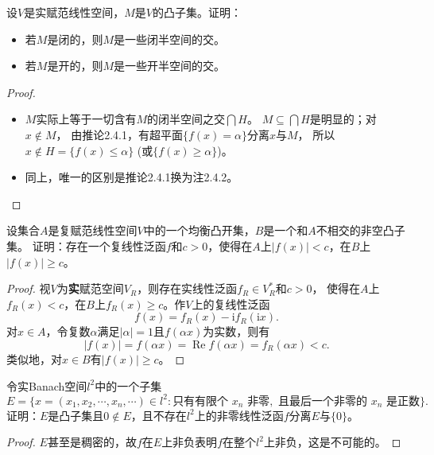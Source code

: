 \begin{8}
    设$V$是实赋范线性空间，$M$是$V$的凸子集。证明：
    \begin{itemize}
        \item[(i)] 若$M$是闭的，则$M$是一些闭半空间的交。
        \item[(ii)] 若$M$是开的，则$M$是一些开半空间的交。
    \end{itemize}
\end{8}
\begin{proof}
    \begin{itemize}
        \item[(i)] $M$实际上等于一切含有$M$的闭半空间之交$\bigcap H$。
        $M\subseteq\bigcap H$是明显的；对$x \notin M$，
        由推论2.4.1，有超平面$\{f(x)=\alpha\}$分离$x$与$M$，
        所以$x \notin H=\{f(x)\leqslant\alpha\}$ (或$\{f(x)\geqslant\alpha\}$)。
        \item[(ii)] 同上，唯一的区别是推论2.4.1换为注2.4.2。\qedhere
    \end{itemize}
\end{proof}

\begin{9}
    设集合$A$是复赋范线性空间$V$中的一个均衡凸开集，$B$是一个和$A$不相交的非空凸子集。
    证明：存在一个复线性泛函$f$和$c>0$，使得在$A$上$|f(x)|<c$，在$B$上$|f(x)|\geqslant c$。
\end{9}
\begin{proof}
    视$V$为\textbf{实}赋范空间$V_R$，则存在实线性泛函$f_R \in V_R^*$和$c>0$，
    使得在$A$上$f_R(x)<c$，在$B$上$f_R(x)\geqslant c$。作$V$上的复线性泛函
    \[f(x)=f_R(x)-\mathrm{i}f_R(\mathrm{i}x).\]
    对$x \in A$，令复数$\alpha$满足$|\alpha|=1$且$f(\alpha x)$为实数，则有
    \[|f(x)|=f(\alpha x)=\operatorname{Re}f(\alpha x)=f_R(\alpha x)<c.\]
    类似地，对$x \in B$有$|f(x)| \geqslant c$。
\end{proof}

\begin{10}
    令实Banach空间$l^2$中的一个子集
    \[E=\{x=(x_1,x_2,\cdots,x_n,\cdots)\in l^2:
    \text{只有有限个 }x_n\text{ 非零},\text{ 且最后一个非零的 }x_n\text{ 是正数}\}.\]
    证明：$E$是凸子集且$0 \notin E$，且不存在$l^2$上的非零线性泛函$f$分离$E$与$\{0\}$。
\end{10}
\begin{proof}
    $E$甚至是稠密的，故$f$在$E$上非负表明$f$在整个$l^2$上非负，这是不可能的。
\end{proof}

